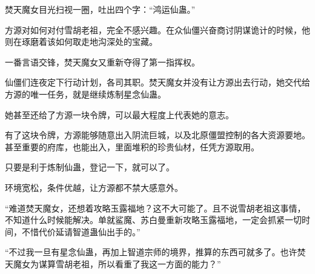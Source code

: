 \begin{this_body}
焚天魔女目光扫视一圈，吐出四个字：“鸿运仙蛊。”

方源对如何对付雪胡老祖，完全不感兴趣。在众仙僵兴奋商讨阴谋诡计的时候，他则在琢磨着该如何取走地沟深处的宝藏。

一番言语交锋，焚天魔女又重新夺得了第一指挥权。

仙僵们连夜定下行动计划，各司其职。焚天魔女并没有让方源出去行动，她交代给方源的唯一任务，就是继续炼制星念仙蛊。

她甚至还给了方源一块令牌，可以最大程度上代表她的意志。

有了这块令牌，方源能够随意出入阴流巨城，以及北原僵盟控制的各大资源要地。甚至重要的府库，也能出入，里面堆积的珍贵仙材，任凭方源取用。

只要是利于炼制仙蛊，登记一下，就可以了。

环境宽松，条件优越，让方源都不禁大感意外。

“难道焚天魔女，还想着攻略玉露福地？这不大可能了。且不说雪胡老祖这事情，不知道什么时候能解决。单就鲨魔、苏白曼重新攻略玉露福地，一定会抓紧一切时间，不惜代价延请智道蛊仙出手的。”

“不过我一旦有星念仙蛊，再加上智道宗师的境界，推算的东西可就多了。也许焚天魔女为谋算雪胡老祖，所以看重了我这一方面的能力？”

\end{this_body}

